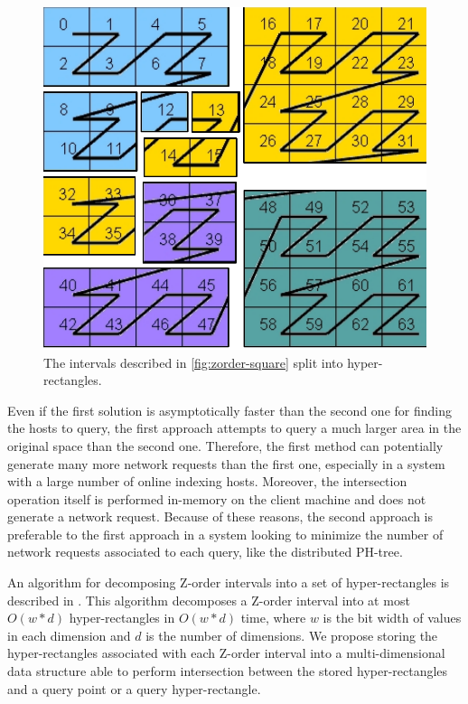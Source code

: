 \documentclass[11pt,a4paper]{globis-book}
\begin{document}
\begin{figure}
    \centering
    \includegraphics[scale=0.5]{images/zorder-rectangles.pdf}
    \caption{The intervals described in \ref{fig:zorder-square} split into hyper-rectangles. }
    \label{fig:zorder-rectangles-split}
\end{figure}
Even if the first solution is asymptotically faster than the second one for finding the hosts to query, the first approach attempts to query a much larger area in the original space than the second one. Therefore, the first method can potentially generate many more network requests than the first one, especially in a system with a large number of online indexing hosts. Moreover, the intersection operation itself is performed in-memory on the client machine and does not generate a network request. Because of these reasons, the second approach is preferable to the first approach in a system looking to minimize the number of network requests associated to each query, like the distributed PH-tree. 

An algorithm for decomposing Z-order intervals into a set of hyper-rectangles is described in \cite{skopal2006-ubtree}. This algorithm decomposes a Z-order interval into at most $O(w * d)$ hyper-rectangles in $O(w * d)$ time, where $w$ is the bit width of values in each dimension and $d$ is the number of dimensions. We propose storing the hyper-rectangles associated with each Z-order interval into a multi-dimensional data structure able to perform intersection between the stored hyper-rectangles and a query point or a query hyper-rectangle.
\end{document}
